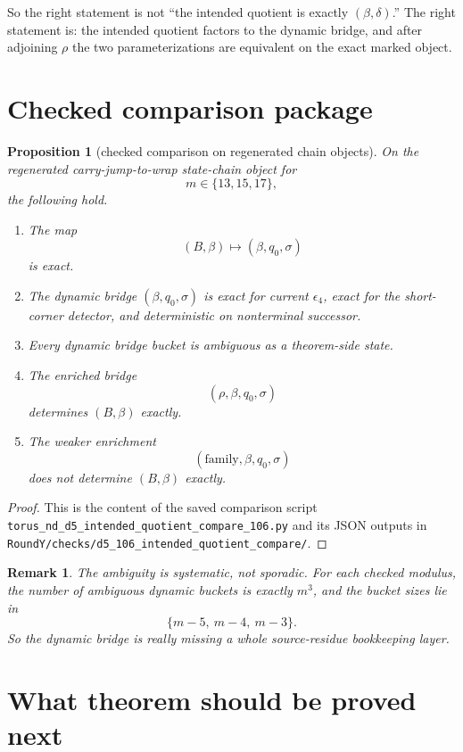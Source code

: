 \documentclass[11pt]{article}
\newtheorem{proposition}[theorem]{Proposition}
\newtheorem{remark}[theorem]{Remark}
\begin{document}
So the right statement is not ``the intended quotient is exactly
$(\beta,\delta)$.'' The right statement is: the intended quotient factors to
the dynamic bridge, and after adjoining $\rho$ the two parameterizations are
equivalent on the exact marked object.

\section{Checked comparison package}

\begin{proposition}[checked comparison on regenerated chain objects]
On the regenerated carry-jump-to-wrap state-chain object for
\[
m\in\{13,15,17\},
\]
the following hold.
\begin{enumerate}[label=\textup{(\alph*)},leftmargin=2.5em]
\item The map
      \[
      (B,\beta)\longmapsto (\beta,q_0,\sigma)
      \]
      is exact.
\item The dynamic bridge $(\beta,q_0,\sigma)$ is exact for current
      $\epsilon_4$, exact for the short-corner detector, and deterministic on
      nonterminal successor.
\item Every dynamic bridge bucket is ambiguous as a theorem-side state.
\item The enriched bridge
      \[
      (\rho,\beta,q_0,\sigma)
      \]
      determines $(B,\beta)$ exactly.
\item The weaker enrichment
      \[
      (\mathrm{family},\beta,q_0,\sigma)
      \]
      does not determine $(B,\beta)$ exactly.
\end{enumerate}
\end{proposition}

\begin{proof}
This is the content of the saved comparison script
\texttt{torus\_nd\_d5\_intended\_quotient\_compare\_106.py} and its JSON
outputs in \texttt{RoundY/checks/d5\_106\_intended\_quotient\_compare/}.
\end{proof}

\begin{remark}
The ambiguity is systematic, not sporadic. For each checked modulus, the number
of ambiguous dynamic buckets is exactly $m^3$, and the bucket sizes lie in
\[
\{m-5,\ m-4,\ m-3\}.
\]
So the dynamic bridge is really missing a whole source-residue bookkeeping
layer.
\end{remark}

\section{What theorem should be proved next}
\end{document}
